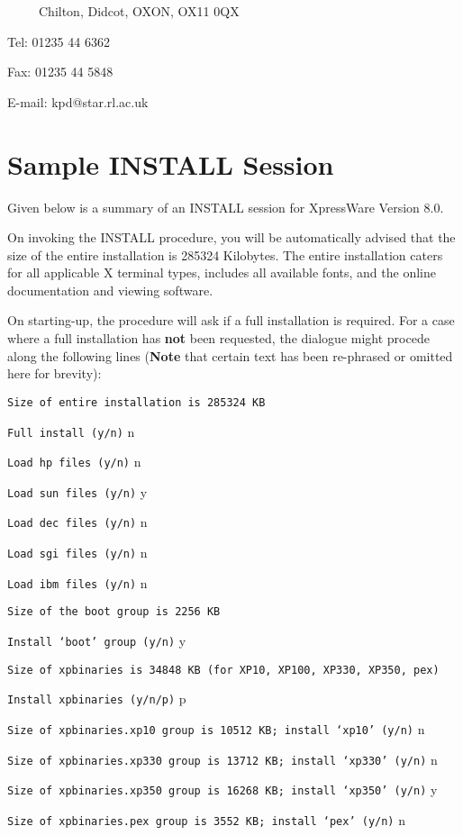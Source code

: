 \documentclass[11pt]{article}
\begin{document}
\ \ \ \ \ Chilton, Didcot, OXON, OX11 0QX

Tel: 01235 44 6362

Fax: 01235 44 5848

E-mail: kpd@star.rl.ac.uk

\clearpage

\appendix

\section {Sample INSTALL Session}

Given below is a summary of an INSTALL session for XpressWare Version 8.0.

On invoking the INSTALL procedure, you will be automatically advised that the
size of the entire installation is 285324 Kilobytes. The entire installation
caters for all applicable X terminal types, includes all available fonts, and
the online documentation and viewing software.

On starting-up, the procedure will ask if a full installation is required. For
a case where a full installation has {\bf not} been requested, the dialogue
might procede along the following lines ({\bf Note} that certain text has been
re-phrased or omitted here for brevity):

{\tt Size of entire installation is 285324 KB}

{\tt Full install (y/n)} n

{\tt Load hp files (y/n)} n

{\tt Load sun files (y/n)} y

{\tt Load dec files (y/n)} n

{\tt Load sgi files (y/n)} n

{\tt Load ibm files (y/n)} n

{\tt Size of the boot group is 2256 KB}

{\tt Install `boot' group (y/n)} y

{\tt Size of xpbinaries is 34848 KB (for XP10, XP100, XP330, XP350, pex)}

{\tt Install xpbinaries (y/n/p)} p

{\tt Size of xpbinaries.xp10 group is 10512 KB; install `xp10' (y/n)} n

{\tt Size of xpbinaries.xp330 group is 13712 KB; install `xp330' (y/n)} n

{\tt Size of xpbinaries.xp350 group is 16268 KB; install `xp350' (y/n)} y

{\tt Size of xpbinaries.pex group is 3552 KB; install `pex' (y/n)} n
\end{document}
